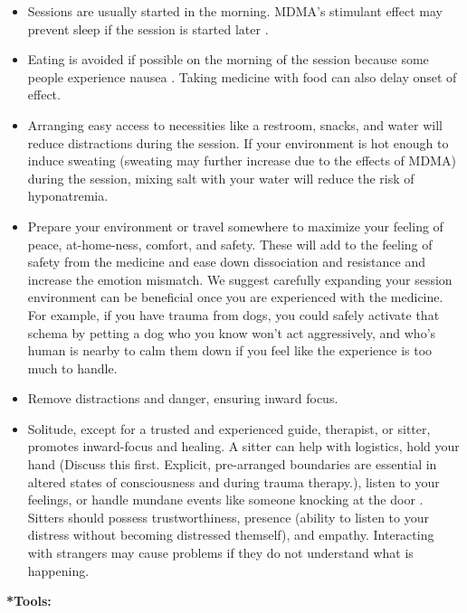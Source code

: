 \documentclass[12pt,letterpaper]{article}
\begin{document}
\begin{itemize}
    \item Sessions are usually started in the morning. MDMA's stimulant effect may prevent sleep if the session is started later \cite{berro2018acute}.
    \item Eating is avoided if possible on the morning of the session because some people experience nausea \cite{mithoeferManual}. Taking medicine with food can also delay onset of effect.
    \item Arranging easy access to necessities like a restroom, snacks, and water will reduce distractions during the session. If your environment is hot enough to induce sweating (sweating may further increase due to the effects of MDMA) during the session, mixing salt with your water will reduce the risk of hyponatremia.
    \label{contextexpansion}
    \item Prepare your environment or travel somewhere to maximize your feeling of peace, at-home-ness, comfort, and safety. These will add to the feeling of safety from the medicine and ease down dissociation and resistance and increase the emotion mismatch. We suggest carefully expanding your session environment can be beneficial once you are experienced with the medicine. For example, if you have trauma from dogs, you could safely activate that schema by petting a dog who you know won't act aggressively, and who's human is nearby to calm them down if you feel like the experience is too much to handle.
    \item Remove distractions and danger, ensuring inward focus. 
\label{def:sitter}
    \item Solitude, except for a trusted and experienced guide, therapist, or sitter, promotes inward-focus and healing. A sitter can help with logistics, hold your hand (Discuss this first. Explicit, pre-arranged boundaries are essential in altered states of consciousness and during trauma therapy.), listen to your feelings, or handle mundane events like someone knocking at the door \cite{mithoeferManual,thalSitter}. Sitters should possess trustworthiness, presence (ability to listen to your distress without becoming distressed themself), and empathy. Interacting with strangers may cause problems if they do not understand what is happening.  
\end{itemize}
\noindent \textbf{*Tools:}
\end{document}
